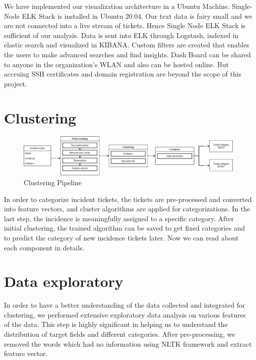 \documentclass[a4paper,12pt]{report}
\begin{document}
    We have implemented our visualization architecture in a Ubuntu Machine. Single-Node ELK Stack \cite{ELKLog} is installed in Ubuntu 20.04. Our text data is fairy small and we are not connected into a live stream of tickets. Hence Single Node ELK Stack is sufficient of our analysis. Data is sent into ELK through Logstash, indexed in elastic search and visualized in KIBANA. Custom filters are created that enables the users to make advanced searches and find insights. 
    \newline
    Dash Board can be shared to anyone in the organization’s WLAN and also can be hosted online. But accruing SSH certificates and domain registration are beyond the scope of this project.


    \section{Clustering}
    \begin{figure}[!h]
        \includegraphics[width=\linewidth]{clustering_motho.png}
        \centering
        \caption{Clustering Pipeline}
    \end{figure}
    
    \noindent In order to categorize incident tickets, the tickets are pre-processed and converted into feature vectors, and cluster algorithms are applied for categorizations. In the last step, the incidence is meaningfully assigned to a specific category. After initial clustering, the trained algorithm can be saved to get fixed categories and to predict the category of new incidence tickets later. Now we can read about each component in details.
    \section{Data exploratory}
    In order to have a better understanding of the data collected and integrated for clustering, we performed extensive exploratory data analysis on various features of the data. This step is highly significant in helping us to understand the distribution of target fields and different categories. After pre-processing, we removed the words which had no information using NLTK framework and extract feature vector.
\end{document}
